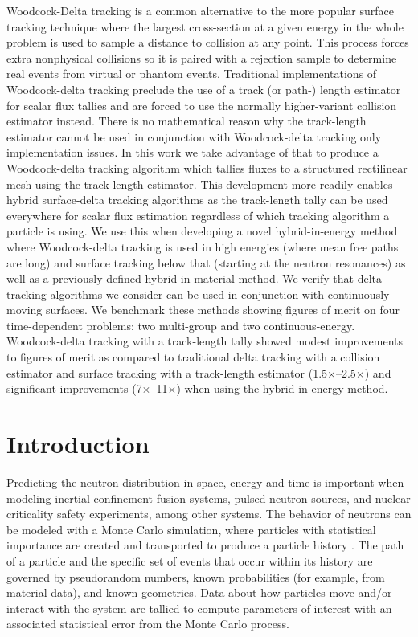 Woodcock-Delta tracking is a common alternative to the more popular surface tracking technique where the largest cross-section at a given energy in the whole problem is used to sample a distance to collision at any point.
This process forces extra nonphysical collisions so it is paired with a rejection sample to determine real events from virtual or phantom events.
Traditional implementations of Woodcock-delta tracking preclude the use of a track (or path-) length estimator for scalar flux tallies and are forced to use the normally higher-variant collision estimator instead.
There is no mathematical reason why the track-length estimator cannot be used in conjunction with Woodcock-delta tracking only implementation issues. 
In this work we take advantage of that to produce a Woodcock-delta tracking algorithm which tallies fluxes to a structured rectilinear mesh using the track-length estimator.
This development more readily enables hybrid surface-delta tracking algorithms as the track-length tally can be used everywhere for scalar flux estimation regardless of which tracking algorithm a particle is using.
We use this when developing a novel hybrid-in-energy method where Woodcock-delta tracking is used in high energies (where mean free paths are long) and surface tracking below that (starting at the neutron resonances) as well as a previously defined hybrid-in-material method.
We verify that delta tracking algorithms we consider can be used in conjunction with continuously moving surfaces.
We benchmark these methods showing figures of merit on four time-dependent problems: two multi-group and two continuous-energy.
Woodcock-delta tracking with a track-length tally showed modest improvements to figures of merit as compared to traditional delta tracking with a collision estimator and surface tracking with a track-length estimator (\num{1.5}$\times$--\num{2.5}$\times$) and significant improvements (\num{7}$\times$--\num{11}$\times$) when using the hybrid-in-energy method.

\section{Introduction}

Predicting the neutron distribution in space, energy and time is important when modeling inertial confinement fusion systems, pulsed neutron sources, and nuclear criticality safety experiments, among other systems.
The behavior of neutrons can be modeled with a Monte Carlo simulation, where particles with statistical importance are created and transported to produce a particle history \cite{lewis_computational_1984}. 
The path of a particle and the specific set of events that occur within its history are governed by pseudorandom numbers, known probabilities (for example, from material data), and known geometries. Data about how
particles move and/or interact with the system are tallied to compute parameters of interest with an associated statistical error from the Monte Carlo process.

